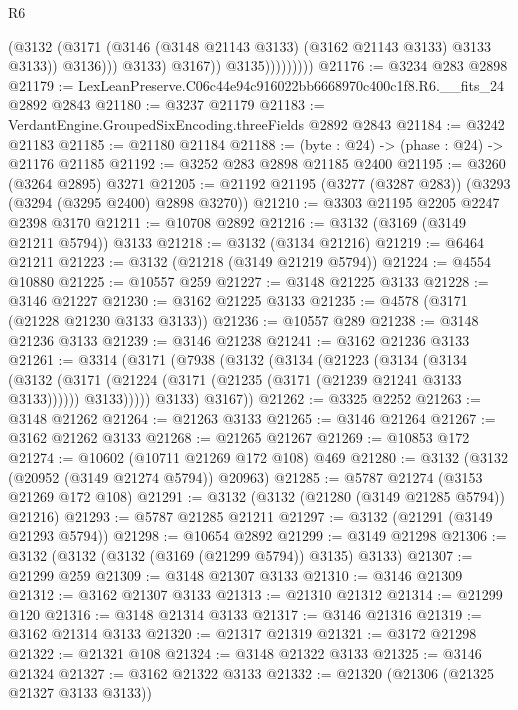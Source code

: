 \begin{lexlean}{R6}
\begin{coremodule}
                                (@3132
                                  (@3171
                                    (@3146 (@3148 @21143 @3133) (@3162 @21143 @3133) @3133 @3133))
                                  @3136)))
                            @3133)
                          @3167))
                      @3135)))))))))
@21176 := @3234 @283 @2898
@21179 := LexLeanPreserve.C06c44e94c916022bb6668970c400c1f8.R6.__fits_24 @2892 @2843
@21180 := @3237 @21179
@21183 := VerdantEngine.GroupedSixEncoding.threeFields @2892 @2843
@21184 := @3242 @21183
@21185 := @21180 @21184
@21188 := (byte : @24) -> (phase : @24) -> @21176 @21185
@21192 := @3252 @283 @2898 @21185 @2400
@21195 := @3260 (@3264 @2895) @3271
@21205 := @21192 @21195 (@3277 (@3287 @283)) (@3293 (@3294 (@3295 @2400) @2898 @3270))
@21210 := @3303 @21195 @2205 @2247 @2398 @3170
@21211 := @10708 @2892
@21216 := @3132 (@3169 (@3149 @21211 @5794)) @3133
@21218 := @3132 (@3134 @21216)
@21219 := @6464 @21211
@21223 := @3132 (@21218 (@3149 @21219 @5794))
@21224 := @4554 @10880
@21225 := @10557 @259
@21227 := @3148 @21225 @3133
@21228 := @3146 @21227
@21230 := @3162 @21225 @3133
@21235 := @4578 (@3171 (@21228 @21230 @3133 @3133))
@21236 := @10557 @289
@21238 := @3148 @21236 @3133
@21239 := @3146 @21238
@21241 := @3162 @21236 @3133
@21261 := @3314
    (@3171
      (@7938
        (@3132
          (@3134
            (@21223
              (@3134
                (@3134
                  (@3132
                    (@3171 (@21224 (@3171 (@21235 (@3171 (@21239 @21241 @3133 @3133))))))
                    @3133)))))
          @3133)
        @3167))
@21262 := @3325 @2252
@21263 := @3148 @21262
@21264 := @21263 @3133
@21265 := @3146 @21264
@21267 := @3162 @21262 @3133
@21268 := @21265 @21267
@21269 := @10853 @172
@21274 := @10602 (@10711 @21269 @172 @108) @469
@21280 := @3132 (@3132 (@20952 (@3149 @21274 @5794)) @20963)
@21285 := @5787 @21274 (@3153 @21269 @172 @108)
@21291 := @3132 (@3132 (@21280 (@3149 @21285 @5794)) @21216)
@21293 := @5787 @21285 @21211
@21297 := @3132 (@21291 (@3149 @21293 @5794))
@21298 := @10654 @2892
@21299 := @3149 @21298
@21306 := @3132 (@3132 (@3132 (@3169 (@21299 @5794)) @3135) @3133)
@21307 := @21299 @259
@21309 := @3148 @21307 @3133
@21310 := @3146 @21309
@21312 := @3162 @21307 @3133
@21313 := @21310 @21312
@21314 := @21299 @120
@21316 := @3148 @21314 @3133
@21317 := @3146 @21316
@21319 := @3162 @21314 @3133
@21320 := @21317 @21319
@21321 := @3172 @21298
@21322 := @21321 @108
@21324 := @3148 @21322 @3133
@21325 := @3146 @21324
@21327 := @3162 @21322 @3133
@21332 := @21320 (@21306 (@21325 @21327 @3133 @3133))

\end{coremodule}
\end{lexlean}
